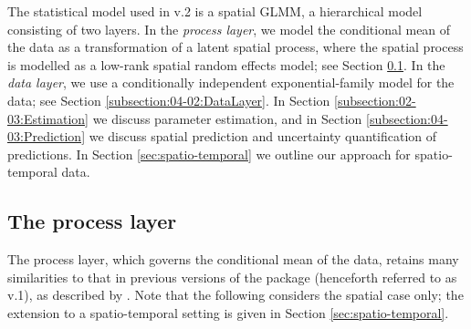 \documentclass[nojss]{jss}
\begin{document}
The statistical model used in  v.2 is a spatial GLMM, a hierarchical model consisting of two layers.
 In the %
\textit{process layer}, we model the conditional mean of the data as a transformation of a latent spatial process, where the spatial process is modelled as a low-rank spatial random effects model; see Section  \ref{subsection:04-01:ProcessLayer}. 
 In the %
\textit{data layer}, we use a conditionally independent exponential-family model for the data; see Section \ref{subsection:04-02:DataLayer}. 
In Section \ref{subsection:02-03:Estimation} we discuss parameter estimation, and in Section \ref{subsection:04-03:Prediction} we discuss spatial prediction and uncertainty quantification of predictions.
In Section \ref{sec:spatio-temporal} we outline our approach for spatio-temporal data. 






\subsection{The process layer} \label{subsection:04-01:ProcessLayer}

The process layer, which governs the conditional mean of the data, retains many similarities to that in previous versions of the package (henceforth referred to as  v.1), as described by \cite{FRK_paper}. 
 Note that the following considers the spatial case only; the extension to a spatio-temporal setting is given in Section \ref{sec:spatio-temporal}. 
 
\end{document}
